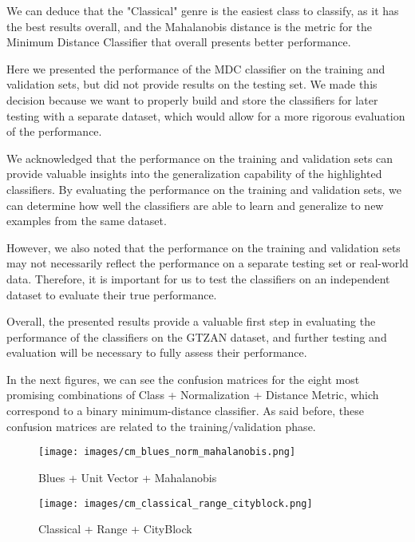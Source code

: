 \documentclass[12pt, a4paper]{article}
\begin{document}
 We can deduce that the "Classical" genre is the easiest class to classify, as it has the best results overall, and the Mahalanobis distance is the metric for the Minimum Distance Classifier that overall presents better performance.

\vspace{1cm}
 Here we presented the performance of the MDC classifier on the training and validation sets, but did not provide results on the testing set. We made this decision because we want to properly build and store the classifiers for later testing with a separate dataset, which would allow for a more rigorous evaluation of the performance.

We acknowledged that the performance on the training and validation sets can provide valuable insights into the generalization capability of the highlighted classifiers. By evaluating the performance on the training and validation sets, we can determine how well the classifiers are able to learn and generalize to new examples from the same dataset.

However, we also noted that the performance on the training and validation sets may not necessarily reflect the performance on a separate testing set or real-world data. Therefore, it is important for us to test the classifiers on an independent dataset to evaluate their true performance.

Overall, the presented results provide a valuable first step in evaluating the performance of the classifiers on the GTZAN dataset, and further testing and evaluation will be necessary to fully assess their performance.

In the next figures, we can see the confusion matrices for the eight most promising combinations of Class + Normalization + Distance Metric, which correspond to a binary minimum-distance classifier. As said before, these confusion matrices are related to the training/validation phase.

\begin{figure}[H]
\centering
\texttt{[image: images/cm\_blues\_norm\_mahalanobis.png]}
\caption{Blues + Unit Vector + Mahalanobis}
\label{fig:myimage}
\end{figure}

\begin{figure}[H]
\centering
\texttt{[image: images/cm\_classical\_range\_cityblock.png]}
\caption{Classical + Range + CityBlock}
\label{fig:myimage}
\end{figure}
\end{document}
